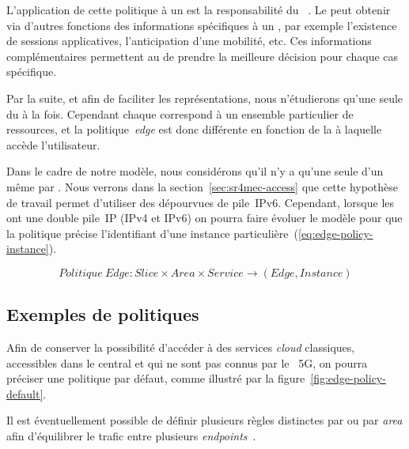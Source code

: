 \documentclass[../main.tex]{subfiles}
\begin{document}
L’application de cette politique à un  est la responsabilité du ~.
Le  peut obtenir via d’autres fonctions des informations spécifiques à un , par exemple l’existence de sessions applicatives, l’anticipation d’une mobilité, etc.
Ces informations complémentaires permettent au  de prendre la meilleure décision pour chaque cas spécifique.

Par la suite, et afin de faciliter les représentations, nous n’étudierons qu’une seule  du  à la fois.
Cependant chaque  correspond à un ensemble particulier de ressources, et la politique~\textit{edge} est donc différente en fonction de la  à laquelle accède l’utilisateur.

Dans le cadre de notre modèle, nous considérons qu’il n’y a qu’une seule  d’un même  par .
Nous verrons dans la section~\ref{sec:sr4mec-access} que cette hypothèse de travail permet d’utiliser des  dépourvues de pile~IPv6.
Cependant, lorsque les  ont une double pile~IP (IPv4 et IPv6) on pourra faire évoluer le modèle pour que la politique précise l’identifiant d’une instance particulière~(\ref{eq:edge-policy-instance}).

\begin{equation}
Politique\ Edge: Slice \times Area \times Service \rightarrow (Edge, Instance)
\label{eq:edge-policy-instance}
\end{equation}

\pagebreak
\subsection{Exemples de politiques}
Afin de conserver la possibilité d’accéder à des services \textit{cloud} classiques, accessibles dans le  central et qui ne sont pas connus par le ~5G, on pourra préciser une politique par défaut, comme illustré par la figure~\ref{fig:edge-policy-default}.

Il est éventuellement possible de définir plusieurs règles distinctes par  ou par \textit{area} afin d’équilibrer le trafic entre plusieurs \textit{endpoints}~.
\end{document}
